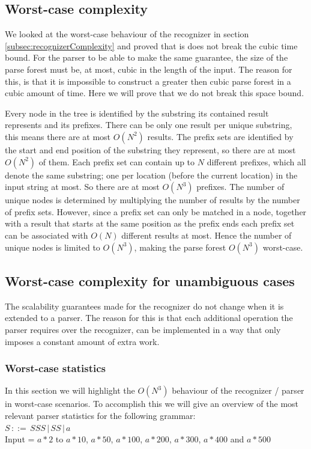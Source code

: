 \documentclass[a4paper,10pt]{article}
\begin{document}
\subsection{Worst-case complexity}

We looked at the worst-case behaviour of the recognizer in section \ref{subsec:recognizerComplexity} and proved that is does not break the cubic time bound. For the parser to be able to make the same guarantee, the size of the parse forest must be, at most, cubic in the length of the input. The reason for this, is that it is impossible to construct a greater then cubic parse forest in a cubic amount of time. Here we will prove that we do not break this space bound.

Every node in the tree is identified by the substring its contained result represents and its prefixes. There can be only one result per unique substring, this means there are at most $O(N^2)$ results. The prefix sets are identified by the start and end position of the substring they represent, so there are at most $O(N^2)$ of them. Each prefix set can contain up to $N$ different prefixes, which all denote the same substring; one per location (before the current location) in the input string at most. So there are at most $O(N^3)$ prefixes. The number of unique nodes is determined by multiplying the number of results by the number of prefix sets. However, since a prefix set can only be matched in a node, together with a result that starts at the same position as the prefix ends each prefix set can be associated with $O(N)$ different results at most. Hence the number of unique nodes is limited to $O(N^3)$, making the parse forest $O(N^3)$ worst-case.

\subsection{Worst-case complexity for unambiguous cases}

The scalability guarantees made for the recognizer do not change when it is extended to a parser. The reason for this is that each additional operation the parser requires over the recognizer, can be implemented in a way that only imposes a constant amount of extra work.

\subsubsection{Worst-case statistics}
In this section we will highlight the $O(N^3)$ behaviour of the recognizer / parser in worst-case scenarios. To accomplish this we will give an overview of the most relevant parser statistics for the following grammar:\\
$S\,::=\,SSS\,|\,SS\,|\,a$\\
Input = $a * 2$ to $a * 10$, $a * 50$, $a * 100$, $a * 200$, $a * 300$, $a * 400$ and $a * 500$
\end{document}
